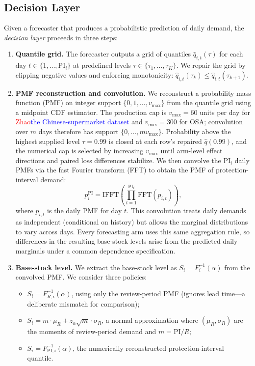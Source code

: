 \documentclass[msom,dblanonrev]{informs4}
\newcommand{\add}[1]{\textcolor{blue}{#1}}
\newcommand{\reduce}[1]{\textcolor{red}{#1}\hspace{0.5em}}
\begin{document}
\subsection{Decision Layer}

Given a forecaster that produces a probabilistic prediction of daily demand, the \emph{decision layer} proceeds in three steps:

\begin{enumerate}
\item \textbf{Quantile grid.}
  The forecaster outputs a grid of quantiles $\hat{q}_{i,t}(\tau)$ for each day $t \in \{1, \ldots, \text{PI}_i\}$ at predefined levels $\tau \in \{\tau_1, \ldots, \tau_K\}$.
  We repair the grid by clipping negative values and enforcing monotonicity: $\hat{q}_{i,t}(\tau_k) \leq \hat{q}_{i,t}(\tau_{k+1})$.

\item \textbf{PMF reconstruction and convolution.}
  We reconstruct a probability mass function (PMF) on integer support $\{0, 1, \ldots, v_{\max}\}$ from the quantile grid using a midpoint CDF estimator.
  The production cap is $v_{\max}=60$ units per day for \reduce{Zhao}\add{the Chinese-supermarket dataset} and $v_{\max}=300$ for OSA; convolution over $m$ days therefore has support $\{0,\ldots,mv_{\max}\}$.
  Probability above the highest supplied level $\tau=0.99$ is closed at each row's repaired $\hat q(0.99)$, and the numerical cap is selected by increasing $v_{\max}$ until arm-level effect directions and paired loss differences stabilize.
  We then convolve the $\text{PI}_i$ daily PMFs via the fast Fourier transform (FFT) to obtain the PMF of protection-interval demand:
  \begin{equation}\label{eq:convolve}
    p_i^{\text{PI}} = \text{IFFT}\!\left(\prod_{t=1}^{\text{PI}_i} \text{FFT}(p_{i,t})\right),
  \end{equation}
  where $p_{i,t}$ is the daily PMF for day $t$.
  This convolution treats daily demands as independent (conditional on history) but allows the marginal distributions to vary across days.
  Every forecasting arm uses this same aggregation rule, so differences in the resulting base-stock levels arise from the predicted daily marginals under a common dependence specification.

\item \textbf{Base-stock level.}
  We extract the base-stock level as $S_i = F_i^{-1}(\alpha)$ from the convolved PMF.
  We consider three policies:
  \begin{itemize}
    \item[\textbf{P1}:] $S_i = F_{R,i}^{-1}(\alpha)$, using only the review-period PMF (ignores lead time---a deliberate mismatch for comparison);
    \item[\textbf{P2}:] $S_i = m \cdot \mu_R + z_\alpha \sqrt{m} \cdot \sigma_R$, a normal approximation where $({\mu_R, \sigma_R})$ are the moments of review-period demand and $m = \text{PI}/R$;
    \item[\textbf{P3}:] $S_i = F_{\text{PI},i}^{-1}(\alpha)$, the numerically reconstructed protection-interval quantile.
  \end{itemize}
\end{enumerate}
\end{document}

